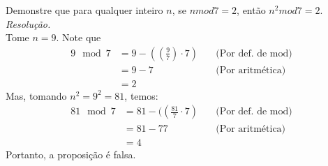 Demonstre que para qualquer inteiro $n$, se $n mod 7 = 2$, então $n^2 mod 7 = 2$. \\
\emph{Resolução.} \\
Tome $n = 9$. Note que
\begin{align*}
	9\mod 7 & = 9 - ((\frac{9}{7}) \cdot 7) & \quad \text{(Por def. de mod)} \\
	        & = 9 - 7                       & \quad \text{(Por aritmética})  \\
	        & = 2
\end{align*}
Mas, tomando $n^2 = 9^2 = 81$, temos:
\begin{align*}
	81\mod 7 & = 81 - ((\frac{81}{7} \cdot 7) & \quad \text{(Por def. de mod)} \\
	         & = 81 - 77                      & \quad \text{(Por aritmética})  \\
	         & = 4
\end{align*}
Portanto, a proposição é falsa.
